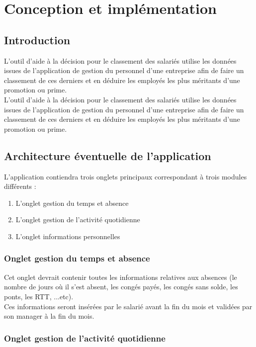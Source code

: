 \chapter{Conception et implémentation}



\section{Introduction}

L’outil d’aide à la décision pour le classement des salariés utilise les données issues de l’application de gestion du personnel d’une entreprise afin de faire un classement de ces derniers et en déduire les employés les plus méritants d’une promotion ou prime.\\
L’outil d’aide à la décision pour le classement des salariés utilise les données issues de l’application de gestion du personnel d’une entreprise afin de faire un classement de ces derniers et en déduire les employés les plus méritants d’une promotion ou prime.\\ 

\section{Architecture éventuelle de l’application }
L’application contiendra trois onglets principaux correspondant à trois modules différents :
\begin{enumerate}
\item L’onglet gestion du temps et absence
\item L’onglet gestion de l’activité quotidienne 
\item L’onglet informations personnelles 
\end{enumerate}

\subsection{Onglet gestion du temps et absence }

Cet onglet devrait contenir toutes les informations relatives aux absences (le nombre de jours où il s’est absent, les congés payés, les congés sans solde, les ponts, les RTT, ...etc).\\

Ces informations seront insérées par le salarié avant la fin du mois et validées par son manager à la fin du mois.

\subsection{Onglet gestion de l’activité quotidienne}

